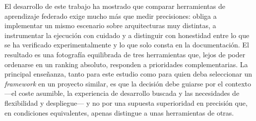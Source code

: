 El desarrollo de este trabajo ha mostrado que comparar herramientas de aprendizaje
federado exige mucho más que medir precisiones: obliga a implementar un mismo escenario
sobre arquitecturas muy distintas, a instrumentar la ejecución con cuidado y a
distinguir con honestidad entre lo que se ha verificado experimentalmente y lo que solo
consta en la documentación. El resultado es una fotografía equilibrada de tres
herramientas que, lejos de poder ordenarse en un ranking absoluto, responden a
prioridades complementarias. La principal enseñanza, tanto para este estudio como para
quien deba seleccionar un \textit{framework} en un proyecto similar, es que la decisión debe
guiarse por el contexto —el coste asumible, la experiencia de desarrollo buscada y las
necesidades de flexibilidad y despliegue— y no por una supuesta superioridad en
precisión que, en condiciones equivalentes, apenas distingue a unas herramientas de
otras.

